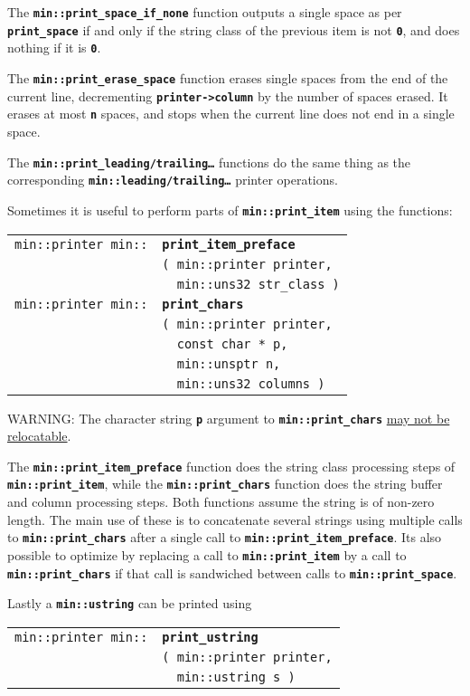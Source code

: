 \documentclass[12pt]{article}
\makeatletter
\newcommand{\TT}[1]{{\tt \bfseries #1}}
\newcommand{\ttindex}[1]{\index{#1@{\tt #1}}}
\newcommand{\EOL}{\penalty \exhyphenpenalty}
\newenvironment{indpar}[1][0.3in]%
	{\begin{list}{}%
		     {\setlength{\itemsep}{0in}%
		      \setlength{\topsep}{0in}%
		      \setlength{\parsep}{1ex}%
		      \setlength{\labelwidth}{#1}%
		      \setlength{\leftmargin}{#1}%
		      \addtolength{\leftmargin}{\labelsep}}%
	 \item}%
	{\end{list}}
\newcommand{\LABEL}[1]{\label{#1}}
\newlength{\ARGBREAKLENGTH}
\newcommand{\ARGBREAK}[1][\ARGBREAKLENGTH]{\\&\hspace*{#1}}
\newcommand{\MINKEY}[1]%
	   {\TT{#1}\ttindex{min::#1}\ttindex{#1}}
\makeatother
\begin{document}
The \TT{min::print\_space\_if\_none} function outputs a single space
as per \TT{print\_space} if and only if the string class of the
previous item is not \TT{0}, and does nothing if it is \TT{0}.

The \TT{min::print\_erase\_space} function erases single spaces from
the end of the current line, decrementing \TT{printer->column} by the
number of spaces erased.  It erases at most \TT{n} spaces, and stops
when the current line does not end in a single space.

The \TT{min::print\_leading/trailing\ldots} functions do the same thing as the
corresponding \TT{min::\EOL leading/\EOL trailing\ldots} printer operations.

Sometimes it is useful to perform parts of \TT{min::\EOL print\_\EOL item}
using the functions:

\begin{indpar}[1em]\begin{tabular}{r@{}l}
\verb|min::printer min::| & \MINKEY{print\_item\_preface}\ARGBREAK
	\verb|( min::printer printer,|\ARGBREAK
	\verb|  min::uns32 str_class )|
\LABEL{MIN::PRINT_ITEM_PREFACE} \\
\verb|min::printer min::| & \MINKEY{print\_chars}\ARGBREAK
	\verb|( min::printer printer,|\ARGBREAK
	\verb|  const char * p,|\ARGBREAK
	\verb|  min::unsptr n,|\ARGBREAK
	\verb|  min::uns32 columns )|
\LABEL{MIN::PRINT_CHARS} \\
\end{tabular}\end{indpar}

WARNING: The character string \TT{p} argument to
\TT{min::\EOL print\_\EOL chars}
\underline{may not be relocatable}.

The \TT{min::print\_item\_preface} function does the string class
processing steps of \TT{min::\EOL print\_\EOL item}, while the
\TT{min::print\_\EOL chars} function does the string buffer and column
processing steps.  Both functions assume the string is of non-zero
length.  The main use of these is to concatenate several strings
using multiple calls to \TT{min::\EOL print\_\EOL chars} after a
single call to \TT{min::\EOL print\_\EOL item\_\EOL preface}.
Its also possible to optimize by replacing a call to
\TT{min::\EOL print\_\EOL item} by a call to
\TT{min::\EOL print\_\EOL chars} if that call is sandwiched between
calls to \TT{min::\EOL print\_\EOL space}.

Lastly a \TT{min::ustring} can be printed using

\begin{indpar}[1em]\begin{tabular}{r@{}l}
\verb|min::printer min::| & \MINKEY{print\_ustring}\ARGBREAK
    \verb|( min::printer printer,|\ARGBREAK
    \verb|  min::ustring s )|
\LABEL{MIN::PRINT_USTRING} \\
\end{tabular}\end{indpar}
\end{document}
